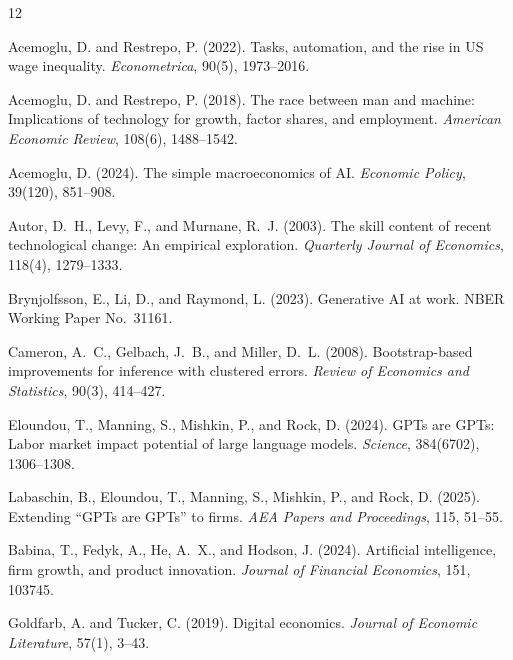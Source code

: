 \documentclass[12pt,a4paper]{article}
\begin{document}
\begin{thebibliography}{12}

Acemoglu, D. and Restrepo, P. (2022).
\newblock Tasks, automation, and the rise in US wage inequality.
\newblock \emph{Econometrica}, 90(5), 1973--2016.

Acemoglu, D. and Restrepo, P. (2018).
\newblock The race between man and machine: Implications of technology for growth, factor shares, and employment.
\newblock \emph{American Economic Review}, 108(6), 1488--1542.

Acemoglu, D. (2024).
\newblock The simple macroeconomics of AI.
\newblock \emph{Economic Policy}, 39(120), 851--908.

Autor, D.~H., Levy, F., and Murnane, R.~J. (2003).
\newblock The skill content of recent technological change: An empirical exploration.
\newblock \emph{Quarterly Journal of Economics}, 118(4), 1279--1333.

Brynjolfsson, E., Li, D., and Raymond, L. (2023).
\newblock Generative AI at work.
\newblock NBER Working Paper No.\ 31161.

Cameron, A.~C., Gelbach, J.~B., and Miller, D.~L. (2008).
\newblock Bootstrap-based improvements for inference with clustered errors.
\newblock \emph{Review of Economics and Statistics}, 90(3), 414--427.

Eloundou, T., Manning, S., Mishkin, P., and Rock, D. (2024).
\newblock GPTs are GPTs: Labor market impact potential of large language models.
\newblock \emph{Science}, 384(6702), 1306--1308.

Labaschin, B., Eloundou, T., Manning, S., Mishkin, P., and Rock, D. (2025).
\newblock Extending ``GPTs are GPTs'' to firms.
\newblock \emph{AEA Papers and Proceedings}, 115, 51--55.

Babina, T., Fedyk, A., He, A.~X., and Hodson, J. (2024).
\newblock Artificial intelligence, firm growth, and product innovation.
\newblock \emph{Journal of Financial Economics}, 151, 103745.

Goldfarb, A. and Tucker, C. (2019).
\newblock Digital economics.
\newblock \emph{Journal of Economic Literature}, 57(1), 3--43.


\end{thebibliography}
\end{document}
